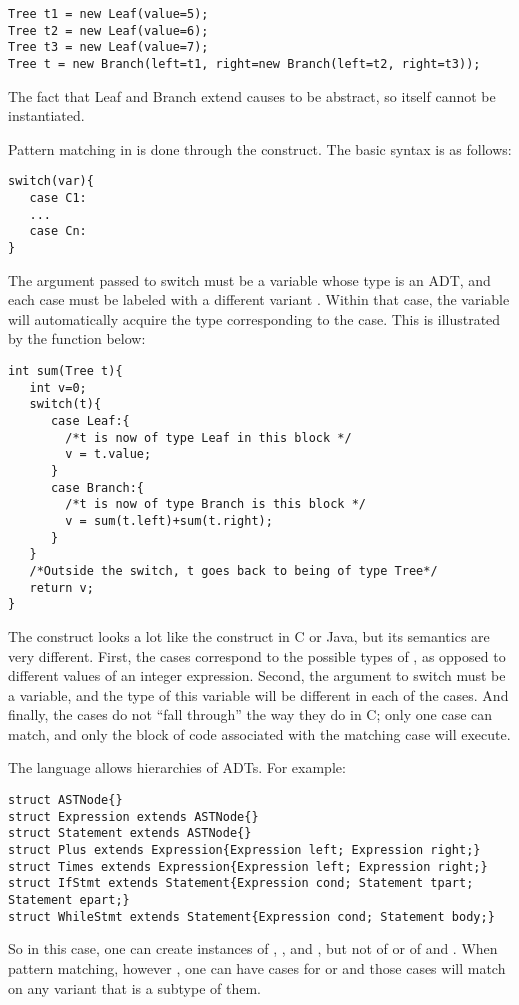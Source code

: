 \begin{lstlisting}
Tree t1 = new Leaf(value=5);
Tree t2 = new Leaf(value=6);
Tree t3 = new Leaf(value=7);
Tree t = new Branch(left=t1, right=new Branch(left=t2, right=t3));
\end{lstlisting}
The fact that Leaf and Branch extend  causes  to be abstract, so  itself cannot be instantiated. 

Pattern matching in \Sk{} is done through the  construct. The basic syntax is as follows:
\begin{lstlisting}
switch(var){
   case C1: 
   ...
   case Cn:
}
\end{lstlisting}
The argument  passed to switch must be a variable whose type is an ADT, and each case must be labeled with a different variant . Within that case, the variable  will automatically acquire the type corresponding to the case. This is illustrated by the function below: 



\begin{lstlisting}
int sum(Tree t){
   int v=0;
   switch(t){
      case Leaf:{
        /*t is now of type Leaf in this block */
        v = t.value;
      }
      case Branch:{
        /*t is now of type Branch is this block */
        v = sum(t.left)+sum(t.right);
      }
   }        
   /*Outside the switch, t goes back to being of type Tree*/
   return v;
}
\end{lstlisting}
The  construct looks a lot like the  construct in C or Java, but its semantics are very different. First, the cases correspond to the possible types of , as opposed to different values of an integer expression. Second, the argument to switch must be a variable, and the type of this variable will be different in each of the cases. And finally, the cases do not ``fall through'' the way they do in C; only one case can match, and only the block of code associated with the matching case will execute.

The language allows hierarchies of ADTs. For example:
\begin{lstlisting}
struct ASTNode{}
struct Expression extends ASTNode{}
struct Statement extends ASTNode{}
struct Plus extends Expression{Expression left; Expression right;}
struct Times extends Expression{Expression left; Expression right;}
struct IfStmt extends Statement{Expression cond; Statement tpart; Statement epart;}
struct WhileStmt extends Statement{Expression cond; Statement body;}
\end{lstlisting}
So in this case, one can create instances of , ,  and , but not of  or of  and . When pattern matching, however , one can have cases for  or  and those cases will match on any variant that is a subtype of them. 

